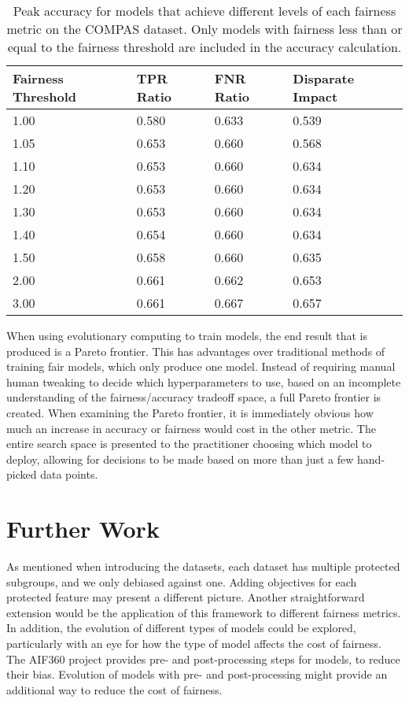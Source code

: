 \documentclass[twoside]{article}
\begin{document}
\renewcommand{\arraystretch}{1.5}
\begin{table}
	\begin{center}
	\begin{tabular}{| l | l | l | l |}
	\hline
	Fairness Threshold & TPR Ratio & FNR Ratio & Disparate Impact \\ \hline
	1.00    & 0.580 & 0.633 & 0.539 \\ \hline
	1.05 & 0.653 & 0.660 & 0.568 \\ \hline
	1.10  & 0.653 & 0.660 & 0.634 \\ \hline
	1.20  & 0.653 & 0.660 & 0.634 \\ \hline
	1.30  & 0.653 & 0.660 & 0.634 \\ \hline
	1.40  & 0.654 & 0.660 & 0.634 \\ \hline
	1.50  & 0.658 & 0.660 & 0.635 \\ \hline
	2.00   & 0.661 & 0.662 & 0.653 \\ \hline
	3.00    & 0.661 & 0.667 & 0.657 \\ \hline
	\end{tabular}
	\end{center}
\caption{Peak accuracy for models that achieve different levels of each fairness metric on the COMPAS dataset. Only models with fairness less than or equal to the fairness threshold are included in the accuracy calculation.}
\label{table:name}
\end{table}

When using evolutionary computing to train models, the end result that is produced is a Pareto frontier. This has advantages over traditional methods of training fair models, which only produce one model. Instead of requiring manual human tweaking to decide which hyperparameters to use, based on an incomplete understanding of the fairness/accuracy tradeoff space, a full Pareto frontier is created. When examining the Pareto frontier, it is immediately obvious how much an increase in accuracy or fairness would cost in the other metric. The entire search space is presented to the practitioner choosing which model to deploy, allowing for decisions to be made based on more than just a few hand-picked data points.

\section{Further Work}
As mentioned when introducing the datasets, each dataset has multiple protected subgroups, and we only debiased against one. Adding objectives for each protected feature may present a different picture. Another straightforward extension would be the application of this framework to different fairness metrics. In addition, the evolution of different types of models could be explored, particularly with an eye for how the type of model affects the cost of fairness. The AIF360 project provides pre- and post-processing steps for models, to reduce their bias. Evolution of models with pre- and post-processing might provide an additional way to reduce the cost of fairness.
\end{document}

